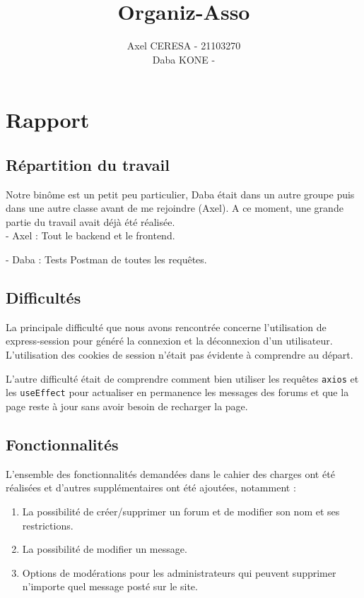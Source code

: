\documentclass{article}
\title{Organiz-Asso}
\author{Axel CERESA - 21103270 \\ Daba KONE -}
\date{}
\begin{document}
\maketitle

\newpage

\section{Rapport}

\subsection{Répartition du travail}
Notre binôme est un petit peu particulier, Daba était dans un autre groupe puis dans une autre classe avant de me rejoindre (Axel). A ce moment, une grande partie du travail avait déjà été réalisée.\\

- Axel : Tout le backend et le frontend.

- Daba : Tests Postman de toutes les requêtes.

\subsection{Difficultés}
La principale difficulté que nous avons rencontrée concerne l'utilisation de express-session pour généré la connexion et la déconnexion d'un utilisateur. L'utilisation des cookies de session n'était pas évidente à comprendre au départ.

L'autre difficulté était de comprendre comment bien utiliser les requêtes \texttt{axios} et les \texttt{useEffect} pour actualiser en permanence les messages des forums et que la page reste à jour sans avoir besoin de recharger la page.

\subsection{Fonctionnalités}
L'ensemble des fonctionnalités demandées dans le cahier des charges ont été réalisées et d'autres supplémentaires ont été ajoutées, notamment :

\begin{enumerate}
    \item La possibilité de créer/supprimer un forum et de modifier son nom et ses restrictions.
    \item La possibilité de modifier un message.
    \item Options de modérations pour les administrateurs qui peuvent supprimer n'importe quel message posté sur le site.
\end{enumerate}
\end{document}
